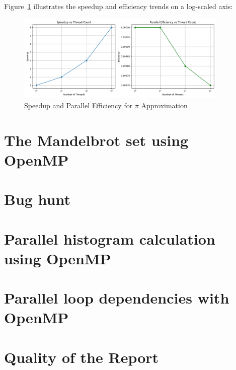 \documentclass[unicode,11pt,a4paper,oneside,numbers=endperiod,openany]{scrartcl}
\begin{document}
Figure~\ref{fig:pi_scaling_plots} illustrates the speedup and efficiency trends on a log-scaled axis:

\begin{figure}[h!]
\centering
\includegraphics[width=0.9\textwidth]{./figures/Figure 5: updated_pi_scaling_plots.png}
\caption{Speedup and Parallel Efficiency for $\pi$ Approximation}
\label{fig:pi_scaling_plots}
\end{figure}


\newpage
\section{The Mandelbrot set using OpenMP }


\newpage
\section{Bug hunt }


\newpage
\section{Parallel histogram calculation using OpenMP }


\newpage
\section{Parallel loop dependencies with OpenMP }


\newpage
\section{Quality of the Report }
\end{document}
